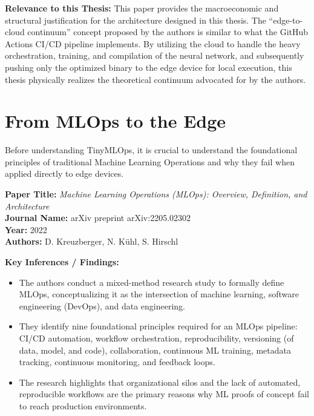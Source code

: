 \documentclass[11pt,a4paper,openany]{book}
\begin{document}
\vspace{0.5em}
\noindent\textbf{Relevance to this Thesis:} This paper provides the macroeconomic and structural justification for the architecture designed in this thesis. The ``edge-to-cloud continuum'' concept proposed by the authors is similar to what the GitHub Actions CI/CD pipeline implements. By utilizing the cloud to handle the heavy orchestration, training, and compilation of the neural network, and subsequently pushing only the optimized binary to the edge device for local execution, this thesis physically realizes the theoretical continuum advocated for by the authors.

\section{From MLOps to the Edge}

Before understanding TinyMLOps, it is crucial to understand the foundational principles of traditional Machine Learning Operations and why they fail when applied directly to edge devices.

\vspace{1.5em}
\noindent\textbf{Paper Title:} \textit{Machine Learning Operations (MLOps): Overview, Definition, and Architecture} \cite{14}\\
\textbf{Journal Name:} arXiv preprint arXiv:2205.02302\\
\textbf{Year:} 2022\\
\textbf{Authors:} D. Kreuzberger, N. Kühl, S. Hirschl

\vspace{0.5em}
\noindent\textbf{Key Inferences / Findings:}
\begin{itemize}
    \item The authors conduct a mixed-method research study to formally define MLOps, conceptualizing it as the intersection of machine learning, software engineering (DevOps), and data engineering.
    \item They identify nine foundational principles required for an MLOps pipeline: CI/CD automation, workflow orchestration, reproducibility, versioning (of data, model, and code), collaboration, continuous ML training, metadata tracking, continuous monitoring, and feedback loops.
    \item The research highlights that organizational silos and the lack of automated, reproducible workflows are the primary reasons why ML proofs of concept fail to reach production environments.
\end{itemize}
\end{document}
